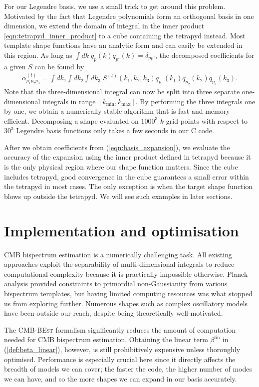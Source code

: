 For our Legendre basis, we use a small trick to get around this problem. Motivated by the fact that Legendre polynomials form an orthogonal basis in one dimension, we extend the domain of integral in the inner product \eqref{eqn:tetrapyd_inner_product} to a cube containing the tetrapyd instead. Most template shape functions have an analytic form and can easily be extended in this region. As long as $\int dk \; q_p(k) q_{p'}(k) = \delta_{pp'}$, the decomposed coefficients for a given $S$ can be found by
\begin{align}
	\alpha^{(t)}_{p_1 p_2 p_3} = \int dk_1 \int dk_2 \int dk_3 \; S^{(t)}(k_1, k_2, k_3) q_{p_1}(k_1) q_{p_2}(k_2) q_{p_3}(k_3). \label{eqn:basis_expansion}
\end{align}
Note that the three-dimensional integral can now be split into three separate one-dimensional integrals in range $[k_\text{min}, k_\text{max}]$. By performing the three integrals one by one, we obtain a numerically stable algorithm that is fast and memory efficient. Decomposing a shape evaluated on $1000^3$ $k$ grid points with respect to $30^3$ Legendre basis functions only takes a few seconds in our \textsc{C} code.

After we obtain coefficients from (\ref{eqn:basis_expansion}), we evaluate the accuracy of the expansion using the inner product defined in tetrapyd because it is the only physical region where our shape function matters. Since the cube includes tetrapyd, good convergence in the cube guarantees a small error within the tetrapyd in most cases. The only exception is when the target shape function blows up outside the tetrapyd. We will see such examples in later sections.


\section{Implementation and optimisation} \label{section:implementation}

CMB bispectrum estimation is a numerically challenging task. All existing approaches exploit the separability of multi-dimensional integrals to reduce computational complexity because it is practically impossible otherwise. Planck analysis provided constraints to primordial non-Gaussianity from various bispectrum templates, but having limited computing resources was what stopped us from exploring further. Numerous shapes such as complex oscillatory models have been outside our reach, despite being theoretically well-motivated.

The \textsc{CMB-BEst} formalism significantly reduces the amount of computation needed for CMB bispectrum estimation. Obtaining the linear term $\beta^\text{lin}$ in (\ref{def:beta_linear}), however, is still prohibitively expensive unless thoroughly optimised. Performance is especially crucial here since it directly affects the breadth of models we can cover; the faster the code, the higher number of modes we can have, and so the more shapes we can expand in our basis accurately.

